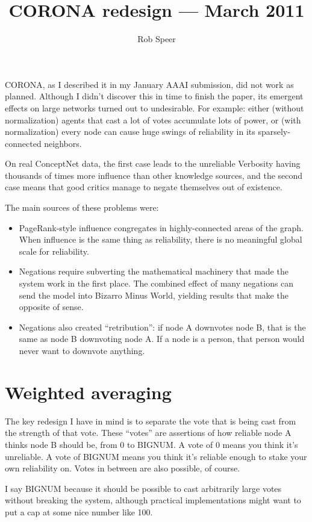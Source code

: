 \documentclass{article}
\title{CORONA redesign --- March 2011}
\author{Rob Speer}
\begin{document}
\maketitle

CORONA, as I described it in my January AAAI submission, did not work as
planned. Although I didn't discover this in time to finish the paper, its
emergent effects on large networks turned out to undesirable.  For example:
either (without normalization) agents that cast a lot of votes accumulate lots
of power, or (with normalization) every node can cause huge swings of
reliability in its sparsely-connected neighbors.

On real ConceptNet data, the first case leads to the unreliable Verbosity
having thousands of times more influence than other knowledge sources, and the
second case means that good critics manage to negate themselves out of
existence.

The main sources of these problems were:
\begin{itemize}
\item PageRank-style influence congregates in highly-connected areas of the
  graph. When influence is the same thing as reliability, there is no
  meaningful global scale for reliability.
\item Negations require subverting the mathematical machinery that made the
  system work in the first place. The combined effect of many negations can
  send the model into Bizarro Minus World, yielding results that make the
  opposite of sense.
\item Negations also created ``retribution'': if node A downvotes node B, that is the
  same as node B downvoting node A. If a node is a person, that person would
  never want to downvote anything.
\end{itemize}
\section{Weighted averaging}

The key redesign I have in mind is to separate the vote that is being cast from
the strength of that vote. These ``votes'' are assertions of how reliable node A
thinks node B should be, from 0 to BIGNUM. A vote of 0 means you think it's
unreliable. A vote of BIGNUM means you think it's reliable enough to stake your
own reliability on. Votes in between are also possible, of course.

I say BIGNUM because it should be possible to cast arbitrarily large votes
without breaking the system, although practical implementations might want to
put a cap at some nice number like 100.
\end{document}
